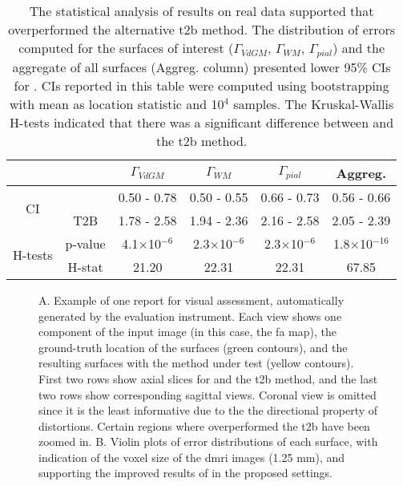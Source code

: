 \begin{table}
		\centering
		\footnotesize
		\tabcolsep=0.08cm
    \begin{tabular}{cccccc}
    & & $\Gamma_{VdGM}$  & $\Gamma_{WM}$ & $\Gamma_{pial}$ & Aggreg. \\
    \hline
    \multirow{2}{*}{CI}
       & \regseg{}        & 0.50 - 0.78 & 0.50 - 0.55 & 0.66 - 0.73 & 0.56 - 0.66 \\
       & T2B                  & 1.78 - 2.58 & 1.94 - 2.36 & 2.16 - 2.58 & 2.05 - 2.39 \\
    \hline
    \multirow{2}{*}{H-tests}
       & p-value  & 4.1$\times$10$^{-6}$& 2.3$\times$10$^{-6}$& 2.3$\times$10$^{-6}$ & 1.8$\times$10$^{-16}$ \\
       & H-stat   & 21.20               & 22.31               & 22.31                & 67.85              \\
    \hline
    \end{tabular}
    \caption{The statistical analysis of results on real data supported that \regseg{} overperformed
    the alternative \acrfull{t2b} method.
    The distribution of errors computed for the surfaces of interest ($\Gamma_{VdGM}$, $\Gamma_{WM}$, $\Gamma_{pial}$)
      and the aggregate of all surfaces (Aggreg. column) presented lower 95\% CIs for \regseg{}.
    CIs reported in this table were computed using bootstrapping with mean as location statistic and 10$^4$ samples.
    The Kruskal-Wallis H-tests indicated that there was a significant difference between \regseg{} and
      the \gls*{t2b} method.
    }\label{tab:results_real}
\end{table}

\begin{figure*}
  \centering
  
  \caption{A. Example of one report for visual assessment, automatically generated by the evaluation instrument.
    Each view shows one component of the input image (in this case, the \gls*{fa} map), the ground-truth location
    of the surfaces (green contours), and the resulting surfaces with the method under test (yellow contours).
  First two rows show axial slices for \regseg{} and the \acrfull*{t2b} method, and the last two rows
    show corresponding sagittal views.
  Coronal view is omitted since it is the least informative due to the the directional property
    of distortions.
  Certain regions where \regseg{} overperformed the \gls*{t2b} have been zoomed in.
  B. Violin plots of error distributions of each surface, with indication of the voxel size of the \gls*{dmri} images
    (1.25 mm), and supporting the improved results of \regseg{} in the proposed settings.
	}\label{fig:results_real}
\end{figure*}